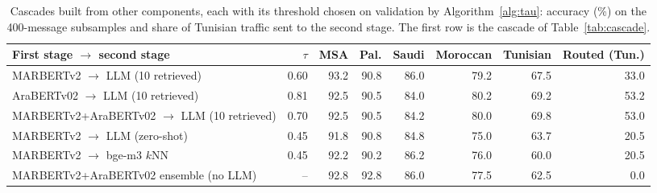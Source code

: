 \begin{table}[t]\centering\small\caption{Cascades built from other components, each with its threshold chosen on validation by Algorithm~\ref{alg:tau}: accuracy (\%) on the 400-message subsamples and share of Tunisian traffic sent to the second stage. The first row is the cascade of Table~\ref{tab:cascade}.}\label{tab:cascade2}
\begin{tabular}{lrrrrrrr}\toprule
First stage $\to$ second stage & $\tau$ & MSA & Pal. & Saudi & Moroccan & Tunisian & Routed (Tun.) \\\midrule
MARBERTv2 $\to$ LLM (10 retrieved) & 0.60 & 93.2 & 90.8 & 86.0 & 79.2 & 67.5 & 33.0 \\
AraBERTv02 $\to$ LLM (10 retrieved) & 0.81 & 92.5 & 90.5 & 84.0 & 80.2 & 69.2 & 53.2 \\
MARBERTv2+AraBERTv02 $\to$ LLM (10 retrieved) & 0.70 & 92.5 & 90.5 & 84.2 & 80.0 & 69.8 & 53.0 \\
MARBERTv2 $\to$ LLM (zero-shot) & 0.45 & 91.8 & 90.8 & 84.8 & 75.0 & 63.7 & 20.5 \\
MARBERTv2 $\to$ bge-m3 $k$NN & 0.45 & 92.2 & 90.2 & 86.2 & 76.0 & 60.0 & 20.5 \\
MARBERTv2+AraBERTv02 ensemble (no LLM) & -- & 92.8 & 92.8 & 86.0 & 77.5 & 62.5 & 0.0 \\
\bottomrule\end{tabular}\end{table}
